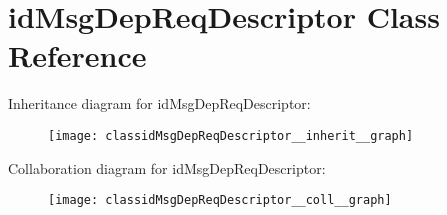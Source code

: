 \hypertarget{classidMsgDepReqDescriptor}{}\section{id\+Msg\+Dep\+Req\+Descriptor Class Reference}
\label{classidMsgDepReqDescriptor}


Inheritance diagram for id\+Msg\+Dep\+Req\+Descriptor\+:\nopagebreak
\begin{figure}[H]
\begin{center}
\leavevmode
\texttt{[image: classidMsgDepReqDescriptor\_\_inherit\_\_graph]}
\end{center}
\end{figure}


Collaboration diagram for id\+Msg\+Dep\+Req\+Descriptor\+:\nopagebreak
\begin{figure}[H]
\begin{center}
\leavevmode
\texttt{[image: classidMsgDepReqDescriptor\_\_coll\_\_graph]}
\end{center}
\end{figure}
